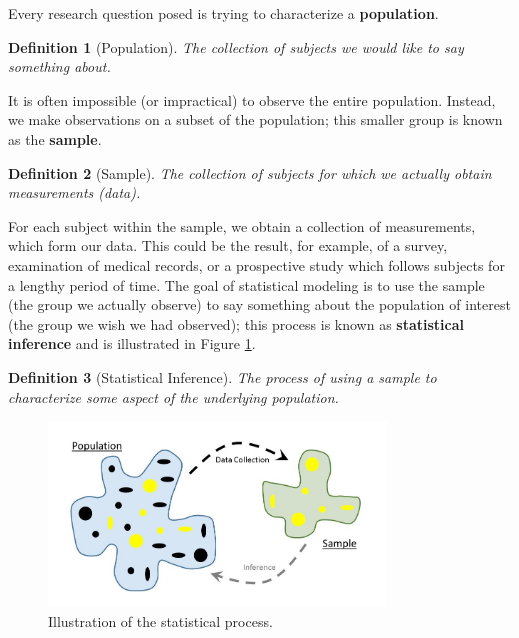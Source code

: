 \documentclass[
]{book}
\theoremstyle{plain}
\theoremstyle{mydefn}
\newtheorem{definition}{Definition}[chapter]
\theoremstyle{myexmpl}
\theoremstyle{remark}
\begin{document}
Every research question posed is trying to characterize a \textbf{population}.

\begin{definition}[Population]
\protect\hypertarget{def:defn-population}{}{\label{def:defn-population} {} }The collection of subjects we would like to say something about.
\end{definition}

It is often impossible (or impractical) to observe the entire population. Instead, we make observations on a subset of the population; this smaller group is known as the \textbf{sample}.

\begin{definition}[Sample]
\protect\hypertarget{def:defn-sample}{}{\label{def:defn-sample} {} }The collection of subjects for which we actually obtain measurements (data).
\end{definition}

For each subject within the sample, we obtain a collection of measurements, which form our data. This could be the result, for example, of a survey, examination of medical records, or a prospective study which follows subjects for a lengthy period of time. The goal of statistical modeling is to use the sample (the group we actually observe) to say something about the population of interest (the group we wish we had observed); this process is known as \textbf{statistical inference} and is illustrated in Figure \ref{fig:statistical-process-statistical-process}.

\begin{definition}[Statistical Inference]
\protect\hypertarget{def:defn-inference}{}{\label{def:defn-inference} {} }The process of using a sample to characterize some aspect of the underlying population.
\end{definition}

\begin{figure}

{\centering \includegraphics[width=0.8\textwidth]{images/Statistical-Process-Statistical-Process} 

}

\caption{Illustration of the statistical process.}\label{fig:statistical-process-statistical-process}
\end{figure}
\end{document}
